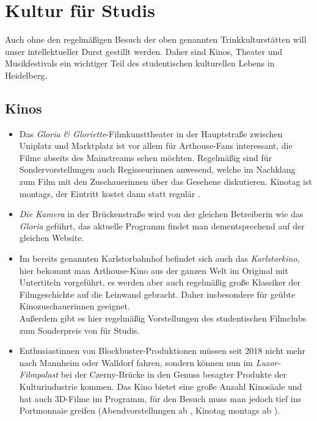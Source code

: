 
\section{Kultur für Studis}

Auch ohne den regelmäßigen Besuch der oben genannten Trinkkulturstätten will unser intellektueller Durst gestillt werden. Daher sind Kinos, Theater und Musikfestivals ein wichtiger Teil des studentischen kulturellen Lebens in Heidelberg.

\subsection{Kinos}
\begin{itemize}
\item Das \emph{Gloria \& Gloriette}-Filmkunsttheater in der Hauptstraße zwischen Uniplatz und Marktplatz ist vor allem für Arthouse-Fans interessant, die Filme abseits des Mainstreams sehen möchten. Regelmäßig sind für Sondervorstellungen auch Regisseurinnen anwesend, welche im Nachklang zum Film mit den Zuschauerinnen über das Gesehene diskutieren. Kinotag ist montags, der Eintritt kostet dann  statt regulär .
\item \emph{Die Kamera} in der Brückenstraße wird von der gleichen Betreiberin wie das \emph{Gloria} geführt, das aktuelle Programm findet man dementsprechend auf der gleichen Website.
\item Im bereits genannten Karlstorbahnhof befindet sich auch das \emph{Karlstorkino}, hier bekommt man Arthouse-Kino aus der ganzen Welt im Original mit Untertiteln vorgeführt, es werden aber auch regelmäßig große Klassiker der Filmgeschichte auf die Leinwand gebracht. Daher insbesondere für geübte Kinozuschauerinnen geeignet.\\
Außerdem gibt es hier regelmäßig Vorstellungen des studentischen Filmclubs zum Sonderpreis von  für Studis.
\item Enthusiastinnen von Block\-bus\-ter-Pro\-duk\-tio\-nen müssen seit 2018 nicht mehr nach Mannheim oder Walldorf fahren, sondern können nun im \emph{Luxor-Filmpalast} bei der Czerny-Brücke in den Genuss besagter Produkte der Kulturindustrie kommen. Das Kino bietet eine große Anzahl Kinosäale und hat auch 3D-Filme im Programm, für den Besuch muss man jedoch tief ins Portmonnaie greifen (Abendvorstellungen ab , Kinotag montags ab ).
\end{itemize} 

